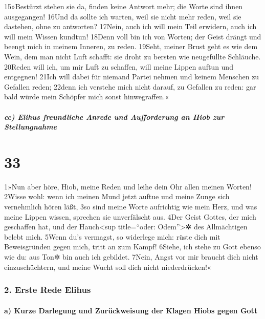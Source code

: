 15»Bestürzt stehen sie da, finden keine Antwort mehr; die Worte sind
ihnen ausgegangen! 16Und da sollte ich warten, weil sie nicht mehr
reden, weil sie dastehen, ohne zu antworten? 17Nein, auch ich will mein
Teil erwidern, auch ich will mein Wissen kundtun! 18Denn voll bin ich
von Worten; der Geist drängt und beengt mich in meinem Inneren, zu
reden. 19Seht, meiner Brust geht es wie dem Wein, dem man nicht Luft
schafft: sie droht zu bersten wie neugefüllte Schläuche. 20Reden will
ich, um mir Luft zu schaffen, will meine Lippen auftun und entgegnen!
21Ich will dabei für niemand Partei nehmen und keinem Menschen zu
Gefallen reden; 22denn ich verstehe mich nicht darauf, zu Gefallen zu
reden: gar bald würde mein Schöpfer mich sonst hinwegraffen.«

\hypertarget{cc-elihus-freundliche-anrede-und-aufforderung-an-hiob-zur-stellungnahme}{%
\subparagraph{cc) Elihus freundliche Anrede und Aufforderung an Hiob zur
Stellungnahme}\label{cc-elihus-freundliche-anrede-und-aufforderung-an-hiob-zur-stellungnahme}}

\hypertarget{section-32}{%
\section{33}\label{section-32}}

1»Nun aber höre, Hiob, meine Reden und leihe dein Ohr allen meinen
Worten! 2Wisse wohl: wenn ich meinen Mund jetzt auftue und meine Zunge
sich vernehmlich hören läßt, 3so sind meine Worte aufrichtig wie mein
Herz, und was meine Lippen wissen, sprechen sie unverfälscht aus. 4Der
Geist Gottes, der mich geschaffen hat, und der Hauch\textless sup
title=``oder: Odem''\textgreater✲ des Allmächtigen belebt mich. 5Wenn
du's vermagst, so widerlege mich: rüste dich mit Beweisgründen gegen
mich, tritt an zum Kampf! 6Siehe, ich stehe zu Gott ebenso wie du: aus
Ton✲ bin auch ich gebildet. 7Nein, Angst vor mir braucht dich nicht
einzuschüchtern, und meine Wucht soll dich nicht niederdrücken!«

\hypertarget{erste-rede-elihus}{%
\subsubsection{2. Erste Rede Elihus}\label{erste-rede-elihus}}

\hypertarget{a-kurze-darlegung-und-zuruxfcckweisung-der-klagen-hiobs-gegen-gott}{%
\paragraph{a) Kurze Darlegung und Zurückweisung der Klagen Hiobs gegen
Gott}\label{a-kurze-darlegung-und-zuruxfcckweisung-der-klagen-hiobs-gegen-gott}}

